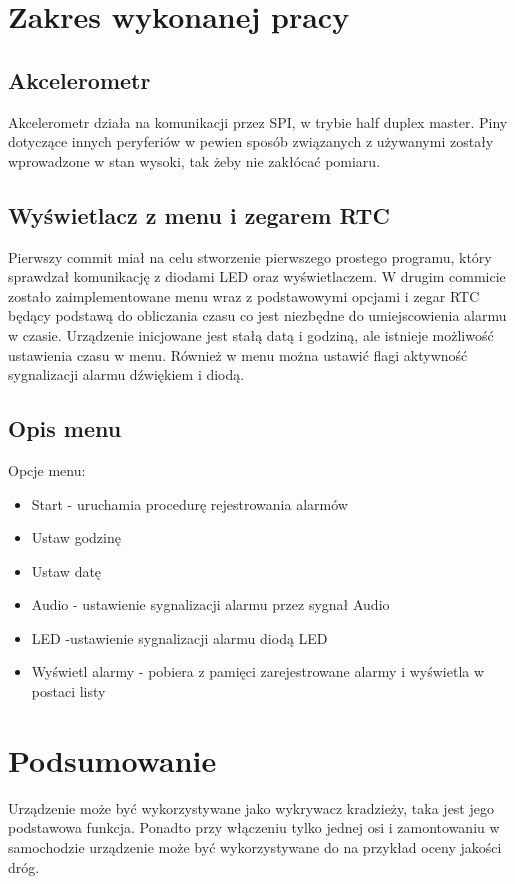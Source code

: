 \documentclass[10pt, a4paper]{article}
\begin{document}
\section{Zakres wykonanej pracy}
\subsection{Akcelerometr}
Akcelerometr działa na komunikacji przez SPI, w trybie half duplex master. Piny dotyczące innych peryferiów w pewien sposób związanych z używanymi zostały wprowadzone w stan wysoki, tak żeby nie zakłócać pomiaru.
\subsection{Wyświetlacz z menu i zegarem RTC}
Pierwszy commit miał na celu stworzenie pierwszego prostego programu, który sprawdzał komunikację z diodami LED oraz wyświetlaczem.
W drugim commicie zostało zaimplementowane menu wraz z podstawowymi opcjami i zegar RTC będący podstawą do obliczania czasu co jest niezbędne do umiejscowienia alarmu w czasie. Urządzenie inicjowane jest stałą datą i godziną, ale istnieje możliwość ustawienia czasu w menu. Również w menu można ustawić flagi aktywność sygnalizacji alarmu dźwiękiem i diodą.



\subsection{Opis menu}

Opcje menu:
\begin {itemize}
\item Start - uruchamia procedurę rejestrowania alarmów
\item Ustaw godzinę
\item Ustaw datę
\item Audio - ustawienie sygnalizacji alarmu przez sygnał Audio
\item LED -ustawienie sygnalizacji alarmu diodą LED
\item Wyświetl alarmy - pobiera z pamięci zarejestrowane alarmy i wyświetla w postaci listy

\end {itemize}

\section{Podsumowanie}
Urządzenie może być wykorzystywane jako wykrywacz kradzieży, taka jest jego podstawowa funkcja. Ponadto przy włączeniu tylko jednej osi i zamontowaniu w samochodzie urządzenie może być wykorzystywane do na przykład oceny jakości dróg.  
\end{document}
